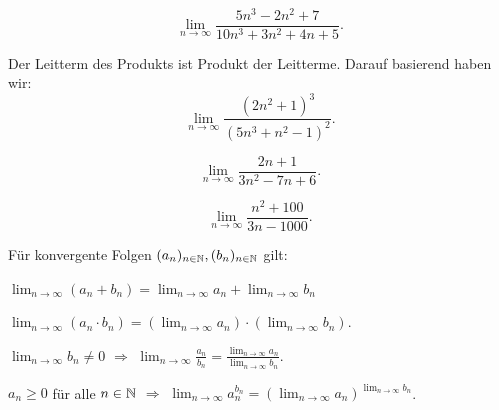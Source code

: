 

\begin{bsp} 
	{\ } 
	\begin{enuma} 
		\item \[
			\lim_{n \to \infty} \frac{5 n^3 - 2n^2 + 7}{10 n^3 + 3 n^2+ 4 n+5}.
		\]
		\item Der Leitterm des Produkts ist Produkt der Leitterme. Darauf basierend haben wir: 
		\[
			\lim_{n \to \infty} \frac{(2 n^2 + 1 )^3 }{(5 n^3 + n^2 - 1)^2}.
		\]
		\item 
			\[
				\lim_{n \to \infty} \frac{2 n + 1}{3  n^2 - 7 n + 6}.
		\]
		\item 
		\[
			\lim_{n \to \infty} \frac{n^2 + 100}{3 n-1000} .
		\]
	\end{enuma} 
\end{bsp} 

\begin{thm} 
	Für konvergente Folgen $(a_n)_{n \in \mathbb{N}}, (b_n)_{n \in \mathbb{N}}$ gilt: 
	\begin{enuma}
		\item $\lim_{n \to \infty} (a_n + b_n) = \lim_{n \to \infty} a_n + \lim_{n \to \infty} b_n $
		\item $\lim_{n \to \infty} (a_n \cdot b_n) = ( \lim_{n \to \infty} a_n) \cdot (\lim_{n \to \infty} b_n)$. 
		\item $\lim_{n \to \infty} b_n \ne 0$ $\Longrightarrow$ $\lim_{n \to \infty} \frac{a_n}{b_n} = \frac{\lim_{n \to \infty} a_n}{\lim_{n \to \infty} b_n}$. 
		\item $a_n \ge 0$ für alle $n \in \mathbb{N}$ $\Longrightarrow$ $\lim_{n \to \infty} a_n^{b_n} = (\lim_{n \to \infty} a_n )^{\lim_{n \to \infty} b_n}$. 
	\end{enuma} 
\end{thm} 

